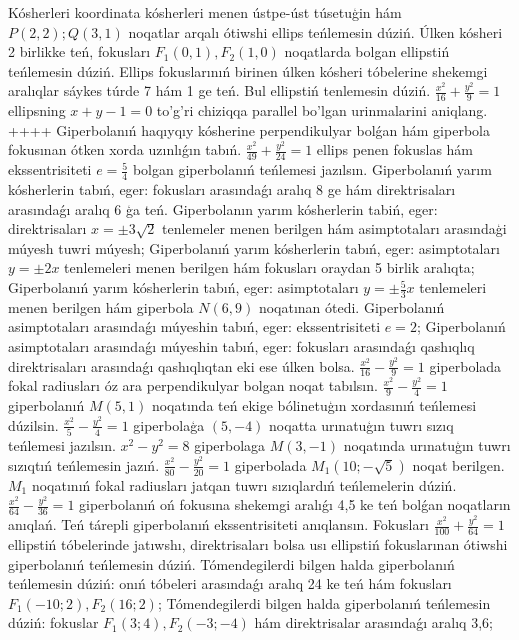 Kósherleri koordinata kósherleri menen ústpe-úst túsetuģin hám $P (2,2); Q (3,1) $ noqatlar arqalı ótiwshi ellips teńlemesin dúziń.
Úlken kósheri 2 birlikke teń, fokusları $F_1 (0,1), F_2 (1,0) $ noqatlarda bolgan ellipstiń teńlemesin dúziń.
Ellips fokuslarınıń birinen úlken kósheri tóbelerine shekemgi aralıqlar sáykes túrde 7 hám 1 ge teń. Bul ellipstiń tenlemesin dúziń.
$\frac{x^2}{16}+\frac{y^2}{9}=1$ ellipsning $x+y-1=0$ to'g'ri chiziqqa parallel bo'lgan urinmalarini aniqlang.
++++
Giperbolanıń haqıyqıy kósherine perpendikulyar bolǵan hám giperbola fokusınan ótken xorda uzınlıǵın tabıń.
$\frac{x^2}{49}+\frac{y^2}{24}=1$ ellips penen fokuslas hám ekssentrisiteti $e=\frac{5}{4}$ bolgan giperbolanıń teńlemesi jazılsın.
Giperbolanıń yarım kósherlerin tabıń, eger: fokusları arasındaǵı aralıq 8 ge hám direktrisaları arasındaǵı aralıq 6 ģa teń.
Giperbolanın yarım kósherlerin tabiń, eger: direktrisaları $x= \pm 3 \sqrt{2}$ tenlemeler menen berilgen hám asimptotaları arasındaģi múyesh tuwri múyesh;
Giperbolanıń yarım kósherlerin tabıń, eger: asimptotaları $y= \pm 2 x$ tenlemeleri menen berilgen hám fokusları oraydan 5 birlik aralıqta;
Giperbolanıń yarım kósherlerin tabıń, eger: asimptotaları $y= \pm \frac{5}{3} x$ tenlemeleri menen berilgen hám giperbola $N (6,9) $ noqatınan ótedi.
Giperbolanıń asimptotaları arasındaǵı múyeshin tabıń, eger: ekssentrisiteti $e=2$;
Giperbolanıń asimptotaları arasındaǵı múyeshin tabıń, eger: fokusları arasındaǵı qashıqlıq direktrisaları arasındaǵı qashıqlıqtan eki ese úlken bolsa.
$\frac{x^2}{16}-\frac{y^2}{9}=1$ giperbolada fokal radiusları óz ara perpendikulyar bolgan noqat tabılsın.
$\frac{x^2}{9}-\frac{y^2}{4}=1$ giperbolanıń $M (5,1) $ noqatında teń ekige bólinetuģın xordasınıń teńlemesi dúzilsin.
$\frac{x^2}{5}-\frac{y^2}{4}=1$ giperbolaģa $ (5,-4) $ noqatta urınatuģın tuwrı sızıq teńlemesi jazılsın.
$x^2-y^2=8$ giperbolaga $M(3,-1)$ noqatında urınatuģın tuwrı sızıqtıń teńlemesin jazıń.
$\frac{x^2}{80}-\frac{y^2}{20}=1$ giperbolada $M_1 (10;-\sqrt{5}) $ noqat berilgen. $M_1$ noqatınıń fokal radiusları jatqan tuwrı sızıqlardıń teńlemelerin dúziń.
$\frac{x^2}{64}-\frac{y^2}{36}=1$ giperbolanıń oń fokusına shekemgi aralıǵı 4,5 ke teń bolǵan noqatların anıqlań.
Teń tárepli giperbolanıń ekssentrisiteti anıqlansın.
Fokusları $\frac{x^2}{100}+\frac{y^2}{64}=1$ ellipstiń tóbelerinde jatıwshı, direktrisaları bolsa usı ellipstiń fokuslarınan ótiwshi giperbolanıń teńlemesin dúziń.
Tómendegilerdi bilgen halda giperbolanıń teńlemesin dúziń: onıń tóbeleri arasındaǵı aralıq 24 ke teń hám fokusları $F_1 (-10; 2), F_2 (16; 2) $;
Tómendegilerdi bilgen halda giperbolanıń teńlemesin dúziń: fokuslar $F_1 (3; 4), F_2 (-3;-4) $ hám direktrisalar arasındaǵı aralıq 3,6;
